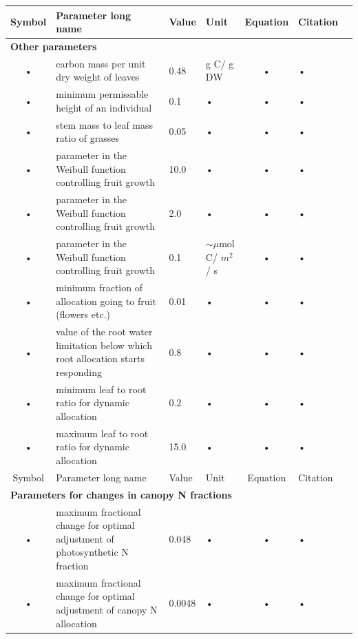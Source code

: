 \documentclass[11pt,oneside,openright,a4paper,fleqn]{book}  %
\begin{document}
\begin{table}
\begin{tabularx}{\linewidth}{|c|X|l|l|c|l|c|} %
\hline 
Symbol & Parameter long name & Value & Unit & Equation & Citation \\
\hline 

\multicolumn{6}{l}{\bf Other parameters}\\
\hline
• & carbon mass per unit dry weight of leaves & 0.48 & g C/ g DW & • & • \\
• & minimum permissable height of an individual & 0.1 & • & • & • \\
• & stem mass to leaf mass ratio of grasses & 0.05 & • & • & • \\
• & parameter in the Weibull function controlling fruit growth & 10.0 & • & • & • \\
• & parameter in the Weibull function controlling fruit growth & 2.0 & • & • & • \\
• & parameter in the Weibull function controlling fruit growth & 0.1 & $\sim\mu$mol C/ $m^2$/ s & • & • \\
• & minimum fraction of allocation going to fruit (flowers etc.) & 0.01 & • & • & • \\
• & value of the root water limitation below which root allocation starts responding & 0.8 & • & • & • \\
• & minimum leaf to root ratio for dynamic allocation & 0.2 & • & • & • \\
• & maximum leaf to root ratio for dynamic allocation & 15.0 & • & • & • \\
\hline 
Symbol & Parameter long name & Value & Unit & Equation & Citation \\
\hline 
\multicolumn{6}{l}{\bf Parameters for changes in canopy N fractions}\\
\hline
 • & maximum fractional change for optimal adjustment of photosynthetic N fraction & 0.048 & • & • & • \\
 • & maximum fractional change for optimal adjustment of canopy N allocation & 0.0048 & • & • & • \\
\hline 
\end{tabularx}
\end{table}
\end{document}
